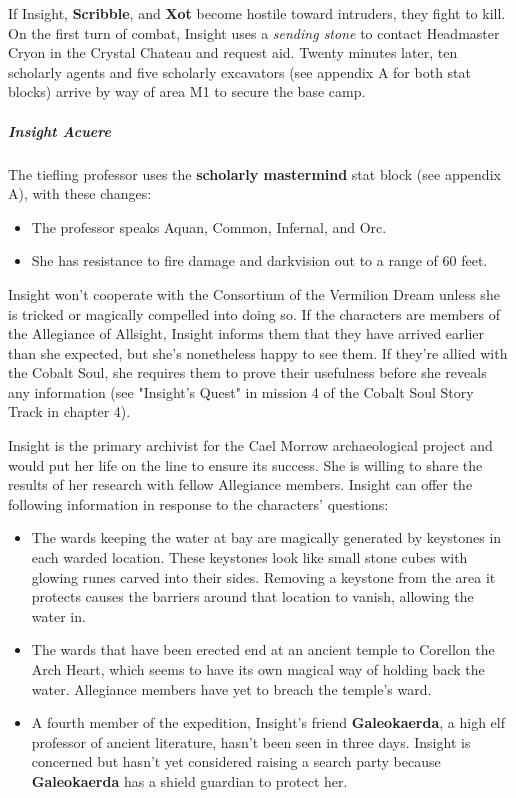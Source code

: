 \documentclass[10pt,a4paper,twoside,bg=print,twocolumn,openany,nodeprecatedcode]{dndbook}
\begin{document}
If Insight, \textbf{Scribble}, and \textbf{Xot} become hostile toward intruders, they fight to kill. On the first turn of combat, Insight uses a \textit{sending stone} to contact Headmaster Cryon in the Crystal Chateau and request aid. Twenty minutes later, ten scholarly agents and five scholarly excavators (see appendix A for both stat blocks) arrive by way of area M1 to secure the base camp.

\subparagraph{Insight Acuere}
The tiefling professor uses the \textbf{scholarly mastermind} stat block (see appendix A), with these changes:


\begin{itemize}
\item The professor speaks Aquan, Common, Infernal, and Orc.
\item She has resistance to fire damage and darkvision out to a range of 60 feet.
\end{itemize}

Insight won't cooperate with the Consortium of the Vermilion Dream unless she is tricked or magically compelled into doing so. If the characters are members of the Allegiance of Allsight, Insight informs them that they have arrived earlier than she expected, but she's nonetheless happy to see them. If they're allied with the Cobalt Soul, she requires them to prove their usefulness before she reveals any information (see "Insight's Quest" in mission 4 of the Cobalt Soul Story Track in chapter 4).

Insight is the primary archivist for the Cael Morrow archaeological project and would put her life on the line to ensure its success. She is willing to share the results of her research with fellow Allegiance members. Insight can offer the following information in response to the characters' questions:


\begin{itemize}
\item The wards keeping the water at bay are magically generated by keystones in each warded location. These keystones look like small stone cubes with glowing runes carved into their sides. Removing a keystone from the area it protects causes the barriers around that location to vanish, allowing the water in.
\item The wards that have been erected end at an ancient temple to Corellon the Arch Heart, which seems to have its own magical way of holding back the water. Allegiance members have yet to breach the temple's ward.
\item A fourth member of the expedition, Insight's friend \textbf{Galeokaerda}, a high elf professor of ancient literature, hasn't been seen in three days. Insight is concerned but hasn't yet considered raising a search party because \textbf{Galeokaerda} has a shield guardian to protect her.
\end{itemize}
\end{document}
